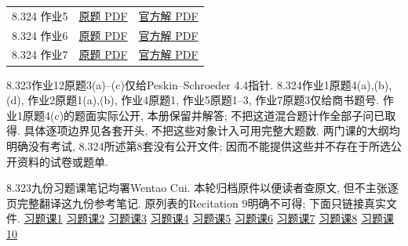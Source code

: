 \begin{longtable}{@{}p{.20\linewidth}p{.30\linewidth}p{.30\linewidth}@{}}
8.324 作业5&\href{https://ocw.mit.edu/courses/8-324-relativistic-quantum-field-theory-ii-fall-2010/4dad2a3af4c55c911f94c336f6ff11c9_MIT8_324F10_ps5.pdf}{原题 PDF}&\href{https://ocw.mit.edu/courses/8-324-relativistic-quantum-field-theory-ii-fall-2010/cab18449404678e3b107433ad4b8bc1b_MIT8_324F10_sol_5.pdf}{官方解 PDF}\\
8.324 作业6&\href{https://ocw.mit.edu/courses/8-324-relativistic-quantum-field-theory-ii-fall-2010/51f5904ee1c6abbdf5f558551ca688d9_MIT8_324F10_ps6.pdf}{原题 PDF}&\href{https://ocw.mit.edu/courses/8-324-relativistic-quantum-field-theory-ii-fall-2010/66315085490bf4a6e34203a72d88f41d_MIT8_324F10_sol_6.pdf}{官方解 PDF}\\
8.324 作业7&\href{https://ocw.mit.edu/courses/8-324-relativistic-quantum-field-theory-ii-fall-2010/d7949c9437a43495043f073f75ed68f6_MIT8_324F10_ps7.pdf}{原题 PDF}&\href{https://ocw.mit.edu/courses/8-324-relativistic-quantum-field-theory-ii-fall-2010/2fde5fa70d8f8fd59e5c0f7a81d2f814_MIT8_324F10_sol_7.pdf}{官方解 PDF}\\
\bottomrule
\end{longtable}
8.323作业12原题3(a)--(c)仅给Peskin--Schroeder 4.4指针. 8.324作业1原题4(a),(b),(d), 作业2原题1(a),(b), 作业4原题1, 作业5原题1--3, 作业7原题3仅给商书题号. 作业1原题4(c)的题面实际公开, 本册保留并解答; 不把这道混合题计作全部子问已取得. 具体逐项边界见各套开头, 不把这些对象计入可用完整大题数. 两门课的大纲均明确没有考试, 8.324所述第8套没有公开文件; 因而不能提供这些并不存在于所选公开资料的试卷或题单.

8.323九份习题课笔记均署Wentao Cui. 本轮归档原件以便读者查原文, 但不主张逐页完整翻译这九份参考笔记. 原列表的Recitation 9明确不可得; 下面只链接真实文件.
\href{https://ocw.mit.edu/courses/8-323-relativistic-quantum-field-theory-i-spring-2023/mit8_323_s23_rec01.pdf}{习题课1}\quad
\href{https://ocw.mit.edu/courses/8-323-relativistic-quantum-field-theory-i-spring-2023/mit8_323_s23_rec02.pdf}{习题课2}\quad
\href{https://ocw.mit.edu/courses/8-323-relativistic-quantum-field-theory-i-spring-2023/mit8_323_s23_rec03.pdf}{习题课3}\quad
\href{https://ocw.mit.edu/courses/8-323-relativistic-quantum-field-theory-i-spring-2023/mit8_323_s23_rec04.pdf}{习题课4}\quad
\href{https://ocw.mit.edu/courses/8-323-relativistic-quantum-field-theory-i-spring-2023/mit8_323_s23_rec05.pdf}{习题课5}\quad
\href{https://ocw.mit.edu/courses/8-323-relativistic-quantum-field-theory-i-spring-2023/mit8_323_s23_rec06.pdf}{习题课6}\quad
\href{https://ocw.mit.edu/courses/8-323-relativistic-quantum-field-theory-i-spring-2023/mit8_323_s23_rec07.pdf}{习题课7}\quad
\href{https://ocw.mit.edu/courses/8-323-relativistic-quantum-field-theory-i-spring-2023/mit8_323_s23_rec08.pdf}{习题课8}\quad
\href{https://ocw.mit.edu/courses/8-323-relativistic-quantum-field-theory-i-spring-2023/mit8_323_s23_rec10.pdf}{习题课10}\quad


